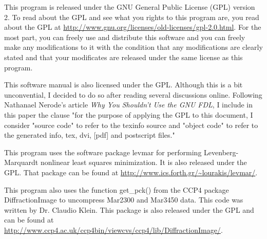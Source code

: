 This program is released under the GNU General
Public License (GPL) version 2.
To read about
the GPL and see what you rights to this program are,
you read about the GPL at
\url{http://www.gnu.org/licenses/old-licenses/gpl-2.0.html}.
For the most part, you can freely use and distribute 
this software and you can freely make any modifications to 
it with the condition that any modifications are clearly stated 
and that your modificates are released under the same license as
this program.

This software manual is also licensed under the GPL. Although
this is a bit unconvential, I decided to do so after reading
several discussions online. Following Nathanael Nerode's 
article {\em Why You Shouldn't Use the GNU FDL}, I include in
this paper the clause "for the purpose of applying the GPL to 
this document, I consider "source code" to refer to the texinfo 
source and "object code" to refer to the generated info, tex, 
dvi, [pdf] and postscript files."\cite{Nerode03}

This program uses the software package
levmar for performing Levenberg-Marquardt nonlinear
least squares minimization.
It is also released under the GPL. That package can be 
found at \url{http://www.ics.forth.gr/~lourakis/levmar/}.\cite{lourakis04LM}

This program also uses the function get\_pck() from the CCP4 package
DiffractionImage to uncompress Mar2300 and Mar3450 data. This code was
written by Dr. Claudio Klein. This package is 
also released under the GPL and can be found at
\url{http://www.ccp4.ac.uk/ccp4bin/viewcvs/ccp4/lib/DiffractionImage/}\cite{Klein95}.


